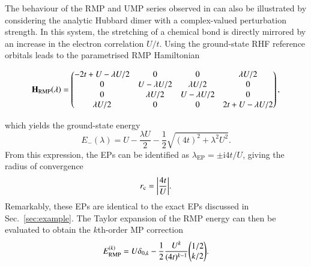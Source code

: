 \documentclass[aps,prb,reprint,noshowkeys,linenumbers,superscriptaddress]{revtex4-1}
\newcommand{\hugh}[1]{\textcolor{hughgreen}{#1}}
\newcommand{\bH}{\mathbf{H}}
\renewcommand{\i}{\mathrm{i}} %
\newcommand{\rc}{r_{\text{c}}}
\newcommand{\lep}{\lambda_{\text{EP}}}
\begin{document}
\hugh{The behaviour of the RMP and UMP series observed in \ce{H2} can also be illustrated by considering
the analytic Hubbard dimer with a complex-valued perturbation strength.
In this system, the stretching of a chemical bond is directly mirrored by an increase in the electron correlation $U/t$.
}
Using the ground-state RHF reference orbitals leads to the \hugh{parametrised} RMP Hamiltonian
\begin{widetext}
\begin{equation}
\label{eq:H_RMP}
\bH_\text{RMP}\qty(\lambda) = 
	\begin{pmatrix}
		-2t + U - \lambda U/2	&	0					&	0					&	\lambda U/2	\\
		0						&	U - \lambda U/2 	&	\lambda U/2			&	0	\\
		0						&	\lambda U/2			&	U - \lambda U/2 	&	0	\\
		\lambda U/2 			&	0 					&	0					&	2t + U - \lambda U/2	\\
	\end{pmatrix},
\end{equation}
\end{widetext}
which yields the ground-state energy 
\begin{equation}
	\label{eq:E0MP}
	E_{-}(\lambda) = U - \frac{\lambda U}{2} - \frac{1}{2} \sqrt{(4t)^2 + \lambda ^2 U^2}.
\end{equation}
From this expression, the EPs can be identified as $\lep = \pm \i 4t / U$,
giving the radius of convergence
\begin{equation}
    \rc = \abs{\frac{4t}{U}}.
\end{equation}
Remarkably, these EPs are identical to the exact EPs discussed in Sec.~\ref{sec:example}.
The Taylor expansion of the RMP energy can then be evaluated to obtain the $k$th-order MP correction
\begin{equation}
	E_\text{RMP}^{(k)} = U \delta_{0,k} - \frac{1}{2} \frac{U^k}{(4t)^{k-1}} \mqty( 1/2 \\ k/2).
\end{equation}
 
\end{document}
